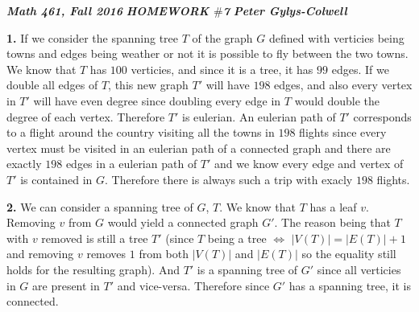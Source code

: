 \documentclass[12pt]{article}
\newenvironment{ques}{\vspace{2 ex}}{\vspace{2 ex}}
\theoremstyle{definition}
\begin{document}
\noindent \textit{\textbf{Math 461, Fall 2016}} \hspace{1.3cm} \textit{\textbf{HOMEWORK $\#$7}} \hspace{1.3cm} \textit{\textbf{Peter Gylys-Colwell}} 

\vspace{1cm}

\begin{ques}
	\textbf{1.}
		If we consider the spanning tree $T$ of the graph $G$ defined with
		verticies being towns and edges being weather or
		not it is possible to fly between the two towns. We know that
		$T$ has $100$ verticies, and since it is a tree, it has $99$ edges. If we
		double all edges of $T$, this new graph $T'$ will have $198$
		edges, and also every vertex in $T'$ will have even
		degree since doubling every edge in $T$ would double the degree
		of each vertex. Therefore $T'$ is eulerian.  An eulerian path of $T'$
		corresponds to a flight around the country visiting
		all the towns in $198$ flights since every vertex must be
		visited in an eulerian path of a connected graph and there are
		exactly $198$ edges in a eulerian path of $T'$ and we know
		every edge and vertex of $T'$ is contained in $G$. Therefore there
		is always such a trip with exacly $198$ flights.
\end{ques}

\begin{ques}
	\textbf{2.}
		We can consider a spanning tree of $G$, $T$. We know that $T$
		has a leaf $v$. Removing $v$ from $G$ would yield a connected
		graph $G'$. The reason being that $T$ with $v$ removed is still a
		tree $T'$ (since $T$ being a tree $\Leftrightarrow$ $|V(T)| = |E(T)|
		+ 1$ and removing $v$ removes $1$ from both $|V(T)|$ and
		$|E(T)|$ so the equality still holds for the resulting graph).
		And $T'$ is a spanning tree of $G'$ since all verticies in $G$
		are present in $T'$ and vice-versa. Therefore since $G'$ has a
		spanning tree, it is connected.
\end{ques}
\end{document}
